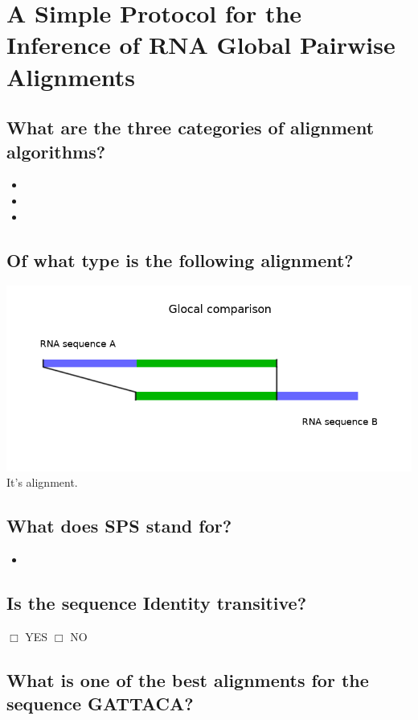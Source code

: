 \documentclass{scrartcl}
\begin{document}
\section*{A Simple Protocol for the Inference of RNA Global Pairwise Alignments}

\vspace{0.5cm}

\subsection*{What are the three categories of alignment algorithms?}
\begin{itemize}
\item 
\item
\item
\end{itemize}

\vspace{0.5cm}

\subsection*{Of what type is the following alignment?}
\includegraphics[width=\textwidth, clip = true, trim = 0mm 0mm 0mm 26mm]{proseminar/images/rna_comparison_glocal}
It's \underline{\hspace{4cm}} alignment.


\vspace{0.5cm}

\subsection*{What does SPS stand for?}
\begin{itemize}
\item 
\end{itemize}

\vspace{0.5cm}

\subsection*{Is the sequence Identity transitive?}
\hspace{2cm} $\Box$ YES \hspace{1cm} $\Box$ NO

\vspace{1cm}

\subsection*{What is one of the best alignments for the sequence GATTACA?}
\end{document}

